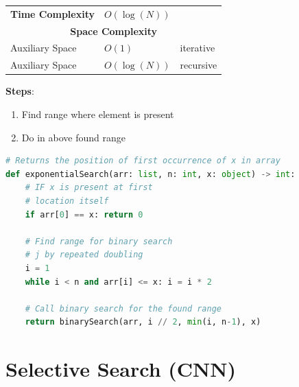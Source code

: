 \begin{table}[h]
    \begin{tabular}{l l l}
         \textbf{Time Complexity} & $O(\log(N))$ &  \\
         \multicolumn{3}{c}{\textbf{Space Complexity}}\\
         Auxiliary Space & $O(1)$ & iterative \\
         Auxiliary Space & $O(\log(N))$ & recursive \\
    \end{tabular}
\end{table}

\textbf{Steps}:
\begin{enumerate}
    \item Find range where element is present
    \item Do  in above found range
\end{enumerate}

\begin{lstlisting}[language=Python, caption=Exponential Search - Python]
# Returns the position of first occurrence of x in array
def exponentialSearch(arr: list, n: int, x: object) -> int:
    # IF x is present at first 
    # location itself
    if arr[0] == x: return 0
         
    # Find range for binary search 
    # j by repeated doubling
    i = 1
    while i < n and arr[i] <= x: i = i * 2
     
    # Call binary search for the found range
    return binarySearch(arr, i // 2, min(i, n-1), x)
\end{lstlisting}


\section{Selective Search (CNN) \cite{https://www.geeksforgeeks.org/r-cnn-region-based-cnns/}}\label{Selective Search (CNN)}

